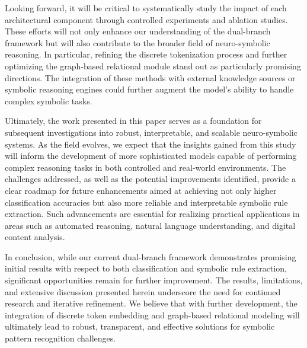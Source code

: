 \documentclass{article}
\begin{document}
Looking forward, it will be critical to systematically study the impact of each architectural component through controlled experiments and ablation studies. These efforts will not only enhance our understanding of the dual-branch framework but will also contribute to the broader field of neuro-symbolic reasoning. In particular, refining the discrete tokenization process and further optimizing the graph-based relational module stand out as particularly promising directions. The integration of these methods with external knowledge sources or symbolic reasoning engines could further augment the model’s ability to handle complex symbolic tasks.

Ultimately, the work presented in this paper serves as a foundation for subsequent investigations into robust, interpretable, and scalable neuro-symbolic systems. As the field evolves, we expect that the insights gained from this study will inform the development of more sophisticated models capable of performing complex reasoning tasks in both controlled and real-world environments. The challenges addressed, as well as the potential improvements identified, provide a clear roadmap for future enhancements aimed at achieving not only higher classification accuracies but also more reliable and interpretable symbolic rule extraction. Such advancements are essential for realizing practical applications in areas such as automated reasoning, natural language understanding, and digital content analysis.

In conclusion, while our current dual-branch framework demonstrates promising initial results with respect to both classification and symbolic rule extraction, significant opportunities remain for further improvement. The results, limitations, and extensive discussion presented herein underscore the need for continued research and iterative refinement. We believe that with further development, the integration of discrete token embedding and graph-based relational modeling will ultimately lead to robust, transparent, and effective solutions for symbolic pattern recognition challenges.
\end{document}
